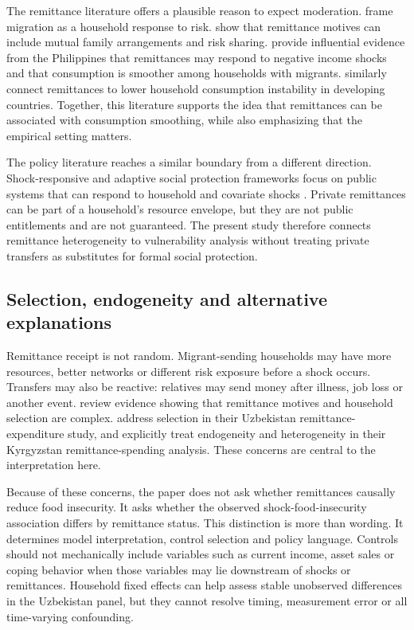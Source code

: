 \documentclass[11pt]{article}
\begin{document}
The remittance literature offers a plausible reason to expect moderation. \textcite{StarkLevhari1982} frame migration as a household response to risk. \textcite{LucasStark1985} show that remittance motives can include mutual family arrangements and risk sharing. \textcite{ChoiYang2007} provide influential evidence from the Philippines that remittances may respond to negative income shocks and that consumption is smoother among households with migrants. \textcite{CombesEbeke2011} similarly connect remittances to lower household consumption instability in developing countries. Together, this literature supports the idea that remittances can be associated with consumption smoothing, while also emphasizing that the empirical setting matters.

The policy literature reaches a similar boundary from a different direction. Shock-responsive and adaptive social protection frameworks focus on public systems that can respond to household and covariate shocks \parencite{OBrien2018,Bowen2020}. Private remittances can be part of a household's resource envelope, but they are not public entitlements and are not guaranteed. The present study therefore connects remittance heterogeneity to vulnerability analysis without treating private transfers as substitutes for formal social protection.

\subsection{Selection, endogeneity and alternative explanations}

Remittance receipt is not random. Migrant-sending households may have more resources, better networks or different risk exposure before a shock occurs. Transfers may also be reactive: relatives may send money after illness, job loss or another event. \textcite{AzamGubert2006} review evidence showing that remittance motives and household selection are complex. \textcite{Kakhkharov2021} address selection in their Uzbekistan remittance-expenditure study, and \textcite{Wang2021} explicitly treat endogeneity and heterogeneity in their Kyrgyzstan remittance-spending analysis. These concerns are central to the interpretation here.

Because of these concerns, the paper does not ask whether remittances causally reduce food insecurity. It asks whether the observed shock-food-insecurity association differs by remittance status. This distinction is more than wording. It determines model interpretation, control selection and policy language. Controls should not mechanically include variables such as current income, asset sales or coping behavior when those variables may lie downstream of shocks or remittances. Household fixed effects can help assess stable unobserved differences in the Uzbekistan panel, but they cannot resolve timing, measurement error or all time-varying confounding.
\end{document}
